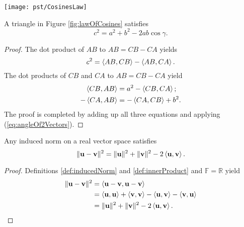 \begin{Figure}
  \centering
  \texttt{[image: pst/CosinesLaw]}
  \label{fig:lawOfCosines}
\end{Figure}

\begin{thm}
  \label{thm:lawOfCosines}
  A triangle in Figure \ref{fig:lawOfCosines} satisfies
  \begin{equation}
    \label{eq:lawOfCosines}
    c^2 = a^2 + b^2 -2ab\cos\gamma.
  \end{equation}
\end{thm}
\begin{proof}
  The dot product of $AB$ to $AB=CB-CA$ yields
  \begin{displaymath}
    c^2 = \left\langle AB, CB \right\rangle - \left\langle AB,CA \right\rangle.
  \end{displaymath}
  The dot products of $CB$ and $CA$ to $AB=CB-CA$ yield
  \begin{align*}
    \left\langle CB, AB \right\rangle &= a^2 - \left\langle CB,CA \right\rangle;
    \\
    -\left\langle CA, AB \right\rangle &= -\left\langle CA, CB \right\rangle + b^2.
  \end{align*}
  The proof is completed by adding up all three equations
  and applying (\ref{eq:angleOf2Vectors}).
\end{proof}

\begin{thm}
  \label{thm:lawOfCosinesAbstractVersion}
  Any induced norm on a real vector space
  satisfies
  \begin{equation}
    \label{eq:lawOfCosinesAbstractVersion}
    \|\mathbf{u} - \mathbf{v}\|^2
    = \|\mathbf{u}\|^2 + \|\mathbf{v}\|^2 - 2\left\langle \mathbf{u}, \mathbf{v} \right\rangle.
  \end{equation}
\end{thm}
\begin{proof}
  Definitions \ref{def:inducedNorm} and \ref{def:innerProduct}
  and $\mathbb{F}=\mathbb{R}$ yield
  \begin{align*}
    \|\mathbf{u} - \mathbf{v}\|^2
    &= \left\langle \mathbf{u} - \mathbf{v}, \mathbf{u} - \mathbf{v} \right\rangle
    \\
    &= \left\langle \mathbf{u}, \mathbf{u} \right\rangle + \left\langle \mathbf{v}, \mathbf{v} \right\rangle
      - \left\langle \mathbf{u}, \mathbf{v} \right\rangle - \left\langle \mathbf{v}, \mathbf{u} \right\rangle
    \\
    &= \|\mathbf{u}\|^2 + \|\mathbf{v}\|^2 - 2\left\langle \mathbf{u},
      \mathbf{v} \right\rangle. \qedhere
  \end{align*}
\end{proof}

